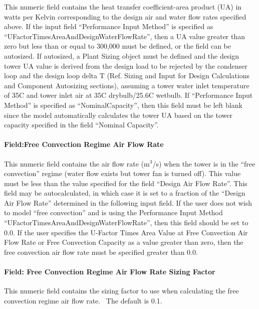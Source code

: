 This numeric field contains the heat transfer coefficient-area product (UA) in watts per Kelvin corresponding to the design air and water flow rates specified above. If the input field ``Performance Input Method'' is specified as ``UFactorTimesAreaAndDesignWaterFlowRate'', then a UA value greater than zero but less than or equal to 300,000 must be defined, or the field can be autosized. If autosized, a Plant Sizing object must be defined and the design tower UA value is derived from the design load to be rejected by the condenser loop and the design loop delta T (Ref. Sizing and Input for Design Calculations and Component Autosizing sections), assuming a tower water inlet temperature of 35C and tower inlet air at 35C drybulb/25.6C wetbulb. If ``Performance Input Method'' is specified as ``NominalCapacity'', then this field must be left blank since the model automatically calculates the tower UA based on the tower capacity specified in the field ``Nominal Capacity''.

\paragraph{Field:Free Convection Regime Air Flow Rate}\label{fieldfree-convection-regime-air-flow-rate}

This numeric field contains the air flow rate (m\(^{3}\)/s) when the tower is in the ``free convection'' regime (water flow exists but tower fan is turned off). This value must be less than the value specified for the field ``Design Air Flow Rate''. This field may be autocalculated, in which case it is set to a fraction of the ``Design Air Flow Rate'' determined in the following input field. If the user does not wish to model ``free convection'' and is using the Performance Input Method ``UFactorTimesAreaAndDesignWaterFlowRate'', then this field should be set to 0.0. If the user specifies the U-Factor Times Area Value at Free Convection Air Flow Rate or Free Convection Capacity as a value greater than zero, then the free convection air flow rate must be specified greater than 0.0.

\paragraph{Field: Free Convection Regime Air Flow Rate Sizing Factor}\label{field-free-convection-regime-air-flow-rate-sizing-factor}

This numeric field contains the sizing factor to use when calculating the free convection regime air flow rate.~ The default is 0.1.

